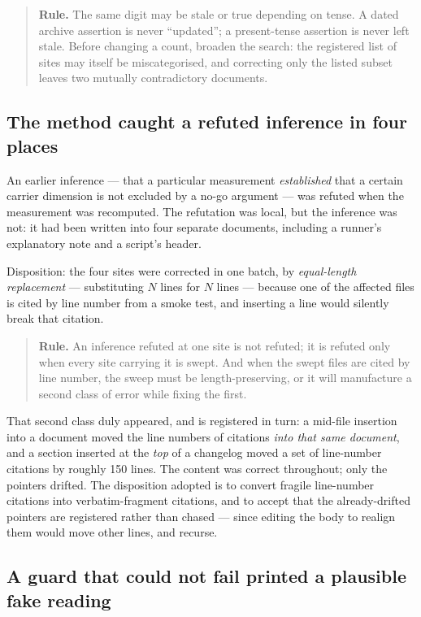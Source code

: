 \documentclass[11pt,a4paper]{article}
\begin{document}
\begin{quote}\small
\textbf{Rule.} The same digit may be stale or true depending on tense. A dated
archive assertion is never ``updated''; a present-tense assertion is never left
stale. Before changing a count, broaden the search: the registered list of sites
may itself be miscategorised, and correcting only the listed subset leaves two
mutually contradictory documents.
\end{quote}

\subsection{The method caught a refuted inference in four places}
\label{sec:spread}

An earlier inference --- that a particular measurement \emph{established} that a
certain carrier dimension is not excluded by a no-go argument --- was refuted
when the measurement was recomputed. The refutation was local, but the inference
was not: it had been written into four separate documents, including a runner's
explanatory note and a script's header.

Disposition: the four sites were corrected in one batch, by \emph{equal-length
replacement} --- substituting $N$ lines for $N$ lines --- because one of the
affected files is cited by line number from a smoke test, and inserting a line
would silently break that citation.

\begin{quote}\small
\textbf{Rule.} An inference refuted at one site is not refuted; it is refuted
only when every site carrying it is swept. And when the swept files are cited by
line number, the sweep must be length-preserving, or it will manufacture a
second class of error while fixing the first.
\end{quote}

That second class duly appeared, and is registered in turn: a mid-file insertion
into a document moved the line numbers of citations \emph{into that same
document}, and a section inserted at the \emph{top} of a changelog moved a set
of line-number citations by roughly 150 lines. The content was correct
throughout; only the pointers drifted. The disposition adopted is to convert
fragile line-number citations into verbatim-fragment citations, and to accept
that the already-drifted pointers are registered rather than chased --- since
editing the body to realign them would move other lines, and recurse.

\subsection{A guard that could not fail printed a plausible fake reading}
\label{sec:fake}
\end{document}
